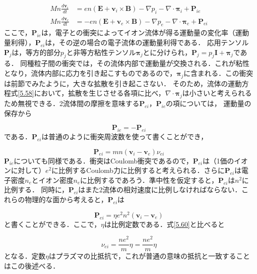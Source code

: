 \documentclass{ltjsarticle}
\numberwithin{equation}{section} %
\begin{document}
\begin{equation}
  \begin{aligned}
    Mn\frac{d\bm{v}_i}{dt} &= en(\bm{E}+\bm{v}_i \times \bm{B}) - \nabla p_i - \nabla \cdot \bm{\pi}_i + \bm{P}_{ie}\\
    Mn\frac{d\bm{v}_e}{dt} &= -en(\bm{E}+\bm{v}_e \times \bm{B}) - \nabla p_e - \nabla \cdot \bm{\pi}_e + \bm{P}_{ei}     
  \end{aligned} \label{5.58}
\end{equation}
ここで，$\bm{P}_{ie}$は，電子との衝突によってイオン流体が得る運動量の変化率（運動量利得），$\bm{P}_{ei}$は，その逆の場合の電子流体の運動量利得である．
応用テンソル$\bm{P}_j$は，等方的部分$p_j$と非等方粘性テンソル$\bm{\pi}_j$とに分けられ，$\bm{P}_j = p_j \bm{I} + \bm{\pi}_j$である．
同種粒子間の衝突では，その流体内部で運動量が交換される．これが粘性となり，流体内部に応力を引き起こすものであるので，$\bm{\pi}_j$に含まれる．この衝突は前節でみたように，大きな拡散を引き起こさない．
そのため，流体の運動方程式\eqref{5.58}において，拡散を生じさせる各項に比べ，$\nabla \cdot \bm{\pi}_j$は小さいと考えられるため無視できる．2流体間の摩擦を意味する$\bm{P}_{ei}$，$\bm{P}_{ie}$の項については，
運動量の保存から

\begin{equation}
  \bm{P}_{ie} = -\bm{P}_{ei} \label{5.59}
\end{equation}
である．$\bm{P}_{ei}$は普通のように衝突周波数を使って書くことができ，

\begin{equation}
  \bm{P}_{ei} = mn(\bm{v}_i - \bm{v}_e)\nu_{ei} \label{5.60}
\end{equation}
$\bm{P}_{ie}$についても同様である．衝突はCoulomb衝突であるので，$\bm{P}_{ei}$は（1価のイオンに対して）$e^2$に比例するCoulomb力に比例すると考えられる．さらに$\bm{P}_{ei}$は電子密度$n_e$とイオン密度$n_e$に比例するであろう．準中性を仮定すると，$\bm{P}_{ei}$は$n^2$に比例する．
同時に，$\bm{P}_{ei}$はまた2流体の相対速度に比例しなければならない．これらの物理的な面から考えると，$\bm{P}_{ei}$は

\begin{equation}
  \bm{P}_{ei} = \eta e^2n^2(\bm{v}_i - \bm{v}_e) \label{5.61} 
\end{equation}
と書くことができる．ここで，$\eta$は比例定数である．式\eqref{5.60}と比べると

\begin{equation}
  \boxed{\nu_{ei} = \frac{ne^2}{m}\eta = \frac{ne^2}{m}\eta} \label{5.62}
\end{equation}
となる．定数$\eta$はプラズマの比抵抗で，これが普通の意味の抵抗と一致することはこの後述べる．
\end{document}
